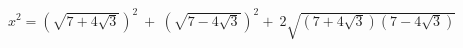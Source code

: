 \documentclass[preview]{standalone}
\begin{document}
\begin{align*}
x^2 = \left(\sqrt{7 + 4 \sqrt{3}}\right)^2 \ + \ \left(\sqrt{7 - 4  \sqrt{3}}\right)^2 + \ 2 \sqrt{\left(7+4\sqrt{3}\right)\left(7-4\sqrt{3}\right)}
\end{align*}
\end{document}
